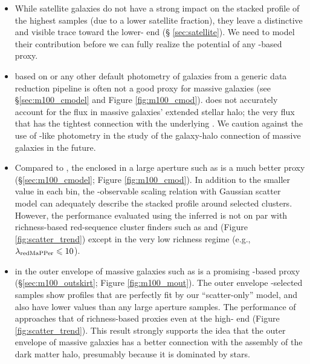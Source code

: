 \documentclass[fleqn,usenatbib,useAMS,english]{mnras}
\begin{document}
    \begin{itemize}

        \item While satellite galaxies do not have a strong impact on the stacked \dsigma{}
            profile of the highest \mstar{} samples (due to a lower satellite fraction),
            they leave a distinctive and visible trace toward the lower-\mstar{} end (\S
            \ref{sec:satellite}). We need to model their contribution before we can fully realize
            the potential of any \mstar{}-based \mvir{} proxy.

        \item \mstar{} based on \cmodel{} or any other default photometry of galaxies from
            a generic data reduction pipeline is often not a good \mvir{} proxy for massive galaxies
            (see \S \ref{sec:m100_cmodel} and Figure \ref{fig:m100_cmod}).
            \cmodel{} does not accurately account for the flux in massive galaxies' extended
            stellar halo; the very flux that has the tightest connection with the underlying \mvir{}.
            We caution against the use of \cmodel{}-like photometry in the study of the galaxy-halo
            connection of massive galaxies in the future.

        \item Compared to \mcmodel{}, the \mstar{} enclosed in a large aperture such as 
            is a much better \mvir{} proxy (\S \ref{sec:m100_cmodel}; Figure \ref{fig:m100_cmod}).
            In addition to the smaller \sigmvir{} value in each bin, the
            \mvir{}-observable scaling relation with Gaussian scatter model can adequately
            describe the stacked \dsigma{} profile around  selected clusters.
            However, the performance evaluated using the inferred \sigmvir{} is not on par with
            richness-based red-sequence cluster finders such as \redm{} and
            \camira{} (Figure \ref{fig:scatter_trend}) except in the very low richness regime
            (e.g., $\lambda_{\rm redMaPPer} \leq 10$).

        \item \mstar{} in the outer envelope of massive galaxies such as  is
            a promising \mstar{}-based \mvir{} proxy (\S \ref{sec:m100_outskirt};
            Figure \ref{fig:m100_mout}).
            The outer envelope \mstar{}-selected samples show \dsigma{} profiles that
            are perfectly fit by our ``scatter-only'' model, and also have lower \sigmvir{}
            values than any large aperture \mstar{} samples.
            The performance of  approaches that of richness-based proxies even at
            the high-\mvir{} end (Figure \ref{fig:scatter_trend}).
            This result strongly supports the idea that the outer envelope of massive galaxies
            has a better connection with the assembly of the dark matter halo, presumably because
            it is dominated by \exsitu{} stars.
        

\end{itemize}
\end{document}
